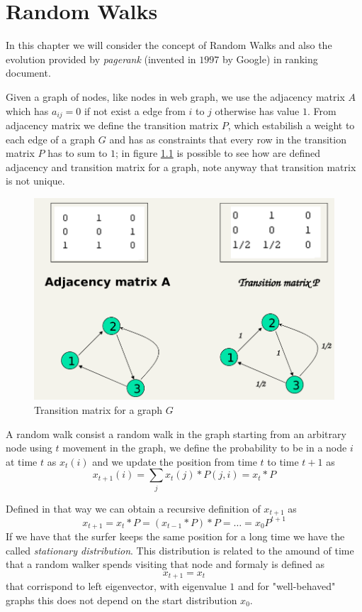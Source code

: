 \chapter{Random Walks}
In this chapter we will consider the concept of Random Walks and also 
the evolution provided by \emph{pagerank} (invented in $1997$ by Google)
in ranking document.

Given a graph of nodes, like nodes in web graph, we use the adjacency matrix
$A$ which has $a_{ij} = 0$ if not exist a edge from $i$ to $j$ otherwise 
has value $1$.\newline
From adjacency matrix we define the transition matrix $P$, which estabilish
a weight to each edge of a graph $G$ and has as constraints that every row
in the transition matrix $P$ has to sum to $1$; in figure \ref{img:transition}
is possible to see how are defined adjacency and transition matrix for a graph,
note anyway that transition matrix is not unique.

\begin{figure}
	\includegraphics[width=\textwidth]{Images/transition}
	\caption{Transition matrix for a graph $G$}
	\label{img:transition}
\end{figure}
A random walk consist a random walk in the graph starting from an arbitrary
node using $t$ movement in the graph, we define the probability to be 
in a node $i$ at time $t$ as $x_t(i)$ and we update the position from time
$t$ to time $t + 1$ as 
\[ x_{t + 1}(i) = \sum _j x_t(j) * P(j, i) = x_t * P \]

Defined in that way we can obtain a recursive definition of $x_{t+1}$ as 
\[ x_{t+1} = x_t * P = (x_{t-1} * P) * P = \dots = x_0 P^{t+1} \]
If we have that the surfer keeps the same position for a long time we have
the called \emph{stationary distribution}.\newline
This distribution is related to the amound of time that a random walker
spends visiting that node and formaly is defined as 
\[ x_{t+1} = x_t \]
that corrispond to left eigenvector, with eigenvalue $1$ and for 
"well-behaved" graphs this does not depend on the start distribution $x_0$.

